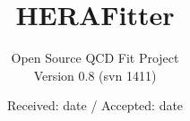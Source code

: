 \usepackage{tikz}
\usetikzlibrary{arrows,shapes,positioning}

\usepackage{multirow}




\usepackage{xspace}
\providecommand{\fitter}{{\texttt{HERAFitter}}\xspace}
\providecommand{\fastnlo}{{\texttt{fastNLO}}\xspace}
\providecommand{\applgrid}{{\texttt{APPLGRID}}\xspace}
\providecommand{\qcdnum}{{\texttt{QCDNUM}}\xspace}
\providecommand{\mcfm}{{\texttt{MCFM}}\xspace}
\providecommand{\nlojetpp}{{\texttt{NLOJet++}}\xspace}
\providecommand{\lhapdf}{{\texttt{LHAPDF}}\xspace}
\providecommand{\crundec}{{\texttt{CRunDec}}\xspace}
\providecommand{\hoppet}{{\texttt{HOPPET}}\xspace}
\providecommand{\GeV}{\ensuremath{\,\text{Ge\hspace{-.08em}V}}\xspace}
\providecommand{\pperp}{\ensuremath{p_{\perp}}\xspace}
\providecommand{\mur}{\ensuremath{\mu_\mathrm{R}}\xspace}
\providecommand{\muf}{\ensuremath{\mu_\mathrm{F}}\xspace}
\providecommand{\as}{\ensuremath{\alpha_\mathrm{s}}\xspace}
\providecommand{\asmz}{\ensuremath{\alpha_\mathrm{s}(M_Z)}\xspace}
\providecommand{\asq}{\ensuremath{\alpha_\mathrm{s}(Q)}\xspace}
\providecommand{\tmdlib}{{\texttt{TMDlib}}\xspace}


%
%


\title{HERAFitter %
}
\subtitle{Open Source QCD Fit Project \\
    { \small {Version 0.8 (svn 1411)}}
}



%
%



\date{Received: date / Accepted: date}


